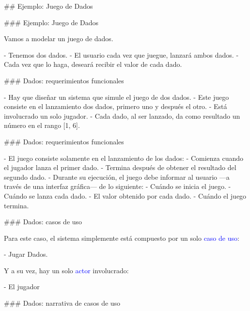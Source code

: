 ## Ejemplo: Juego de Dados

### Ejemplo: Juego de Dados


Vamos a modelar un juego de dados.\newline

- Tenemos dos dados.
- El usuario cada vez que juegue, lanzará ambos dados.
- Cada vez que lo haga, deseará recibir el valor de cada dado.

### Dados: requerimientos funcionales

\label{dados:clases}

- Hay que diseñar un \alert{sistema} que simule el \alert{juego de dos dados}.
    - Este juego consiste en el \alert{lanzamiento} dos \alert{dados}, primero uno y después el otro.
- Está involucrado un solo \alert{jugador}.
- Cada dado, al ser lanzado, da como \alert{resultado} un número en el rango [1, 6].

### Dados: requerimientos funcionales


- El juego consiste solamente en el lanzamiento de los dados:
    - Comienza cuando el jugador lanza el \alert{primer dado}.
    - Termina después de obtener el resultado del \alert{segundo dado}.
- Durante su ejecución, el juego debe informar al \alert{usuario} ---a través de una \alert{interfaz gráfica}--- de lo siguiente:
    - Cuándo se inicia el juego.
    - Cuándo se lanza cada dado.
    - El valor obtenido por cada dado.
    - Cuándo el juego termina.

### Dados: casos de uso


Para este caso, el sistema simplemente está compuesto por un solo \textcolor{blue}{caso de uso}:

- Jugar Dados.

Y a su vez, hay un solo \textcolor{blue}{actor} involucrado:

- El jugador

\exUseCaseDices

### Dados: narrativa de casos de uso



